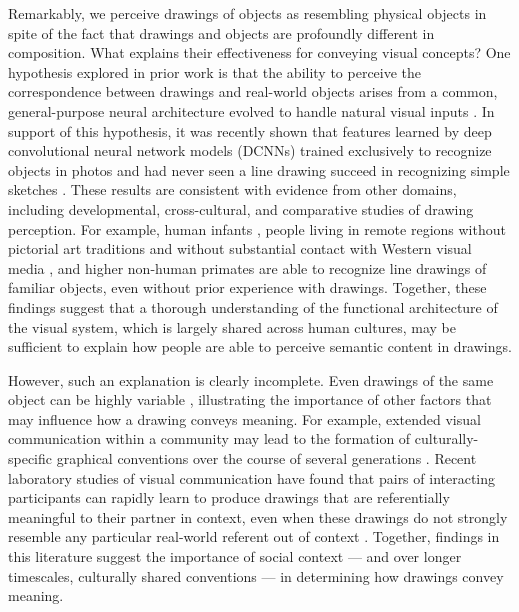 \documentclass[9pt,twocolumn,twoside]{pnas-new}
\begin{document}
Remarkably, we perceive drawings of objects as resembling physical objects in spite of the fact that drawings and objects are profoundly different in composition. 
What explains their effectiveness for conveying visual concepts? 
One hypothesis explored in prior work is that the ability to perceive the correspondence between drawings and real-world objects arises from a common, general-purpose neural architecture evolved to handle natural visual inputs \cite{Sayim:2011bz,gibson2014ecological}. 
In support of this hypothesis, it was recently shown that features learned by deep convolutional neural network models (DCNNs) trained exclusively to recognize objects in photos and had never seen a line drawing succeed in recognizing simple sketches \cite{FanCommon2018,yamins2014performance}. 
These results are consistent with evidence from other domains, including developmental, cross-cultural, and comparative studies of drawing perception. 
For example, human infants \cite{hochberg1962pictorial}, people living in remote regions without pictorial art traditions and without substantial contact with Western visual media \cite{kennedy1975outline}, and higher non-human primates \cite{tanaka2007recognition} are able to recognize line drawings of familiar objects, even without prior experience with drawings. 
Together, these findings suggest that a thorough understanding of the functional architecture of the visual system, which is largely shared across human cultures, may be sufficient to explain how people are able to perceive semantic content in drawings.

However, such an explanation is clearly incomplete. 
Even drawings of the same object can be highly variable \cite{quickdraw2017}, illustrating the importance of other factors that may influence how a drawing conveys meaning. 
For example, extended visual communication within a community may lead to the formation of culturally-specific graphical conventions over the course of several generations \cite{toku2001cross,boltz1994origin}. 
Recent laboratory studies of visual communication have found that pairs of interacting participants can rapidly learn to produce drawings that are referentially meaningful to their partner in context, even when these drawings do not strongly resemble any particular real-world referent out of context \cite{Garrod:2007wk,fay2010interactive,Galantucci:2005uh,Healey:2007vq}. 
Together, findings in this literature suggest the importance of social context --- and over longer timescales, culturally shared conventions --- in determining how drawings convey meaning.
\end{document}
